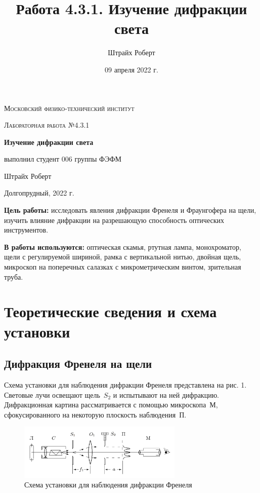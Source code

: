 \documentclass[a4paper, 12pt]{article}
\author{Штрайх Роберт}
\title{Работа 4.3.1. Изучение дифракции света}
\date{09 апреля 2022 г.}
\begin{document}
\begin{titlepage}
	\centering
	\vspace{5cm}
	{\scshape\LARGE Московский физико-технический институт \par}
	\vspace{4cm}
	{\scshape\Large Лабораторная работа №4.3.1 \par}
	\vspace{1cm}
	{\huge\bfseries Изучение дифракции света\par}
	\vspace{1cm}
	\vfill
\begin{flushright}
  {\Large выполнил студент 006 группы ФЭФМ}\par
	\vspace{0.3cm}
	{\Large Штрайх Роберт}\par
\end{flushright}


	\vfill

	Долгопрудный, 2022 г.
\end{titlepage}

\newpage

\textbf{Цель работы:} исследовать явления дифракции Френеля и Фраунгофера на щели, изучить влияние дифракции на разрешающую способность оптических инструментов.

\textbf{В работы используются:} оптическая скамья, ртутная лампа, монохроматор, щели с регулируемой шириной, рамка с вертикальной нитью, двойная щель, микроскоп на поперечных салазках с микрометрическим винтом, зрительная труба.

\section{Теоретические сведения и схема установки}
\subsection{Дифракция Френеля на щели}

Схема установки для наблюдения дифракции Френеля представлена на рис. 1. Световые лучи освещают щель~$S_2$ и испытывают на ней дифракцию. Дифракционная картина рассматривается с помощью микроскопа~М, сфокусированного на некоторую плоскость наблюдения~П.
		\begin{figure}[h]
		\begin{center}
			\includegraphics[width = 0.7\textwidth]{431-1.png}
			\caption{Схема установки для наблюдения дифракции Френеля}
			\label{Френель схема установки}
		\end{center}
	\end{figure}
\end{document}
